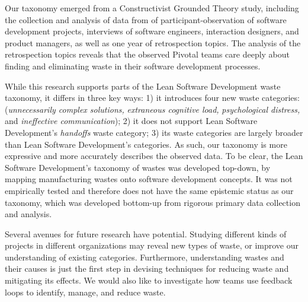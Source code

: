 Our taxonomy emerged from a Constructivist Grounded Theory study, including the collection and analysis of data from \durationOfResearchStudyPlural{} of participant-observation of  \numberOfObservedProjects{} software development projects, interviews of \numberOfInterviews{} software engineers, interaction designers, and product managers, as well as one year of retrospection topics. The analysis of the retrospection topics reveals that the observed Pivotal teams care deeply about finding and eliminating waste in their software development processes. 

While this research supports parts of the Lean Software Development waste taxonomy, it differs in three key ways: 1) it introduces four new waste categories: (\textit{unnecessarily complex solutions,} \textit{extraneous cognitive load,} \textit{psychological distress,} and \textit{ineffective communication}); 2) it does not support Lean Software Development's \textit{handoffs} waste category; 3) its waste categories are largely broader than Lean Software Development's categories. As such, our taxonomy is more expressive and more accurately describes the observed data. To be clear, the Lean Software Development's taxonomy of wastes was developed top-down, by mapping manufacturing wastes onto software development concepts. It was not empirically tested and therefore does not have the same epistemic status as our taxonomy, which was developed bottom-up from rigorous primary data collection and analysis. 

Several avenues for future research have potential. Studying different kinds of projects in different organizations may reveal new types of waste, or improve our understanding of existing categories. Furthermore, understanding wastes and their causes is just the first step in devising techniques for reducing waste and mitigating its effects. We would also like to investigate how teams use feedback loops to identify, manage, and reduce waste. 



